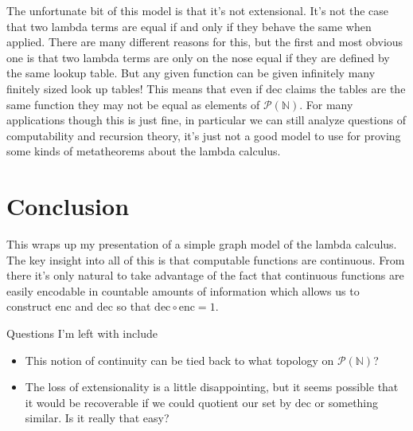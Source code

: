 \documentclass{amsart}
\newcommand{\enc}{\text{enc}}
\newcommand{\dec}{\text{dec}}
\begin{document}
The unfortunate bit of this model is that it's not extensional. It's
not the case that two lambda terms are equal if and only if they
behave the same when applied. There are many different reasons for
this, but the first and most obvious one is that two lambda terms are
only on the nose equal if they are defined by the same lookup
table. But any given function can be given infinitely many finitely
sized look up tables! This means that even if $\dec$ claims the tables
are the same function they may not be equal as elements of
$\mathcal{P}(\mathbb{N})$. For many applications though this is just
fine, in particular we can still analyze questions of computability
and recursion theory, it's just not a good model to use for proving
some kinds of metatheorems about the lambda calculus.

\section{Conclusion}

This wraps up my presentation of a simple graph model of the lambda
calculus. The key insight into all of this is that computable
functions are continuous. From there it's only natural to take
advantage of the fact that continuous functions are easily encodable
in countable amounts of information which allows us to construct
$\enc$ and $\dec$ so that $\dec \circ \enc = 1$.

Questions I'm left with include

\begin{itemize}
\item This notion of continuity can be tied back to what topology on
  $\mathcal{P}(\mathbb{N})$?
\item The loss of extensionality is a little disappointing, but it
  seems possible that it would be recoverable if we could quotient our
  set by $\dec$ or something similar. Is it really that easy?
\end{itemize}
\end{document}
